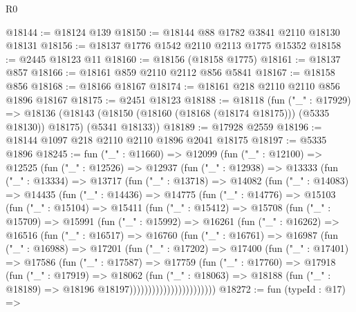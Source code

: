 \begin{lexlean}{R0}
\begin{coremodule}
@18144 := @18124 @139
@18150 := @18144 @88 @1782 @3841 @2110 @18130 @18131
@18156 := @18137 @1776 @1542 @2110 @2113 @1775 @15352
@18158 := @2445 @18123 @11
@18160 := @18156 (@18158 @1775)
@18161 := @18137 @857
@18166 := @18161 @859 @2110 @2112 @856 @5841
@18167 := @18158 @856
@18168 := @18166 @18167
@18174 := @18161 @218 @2110 @2110 @856 @1896 @18167
@18175 := @2451 @18123
@18188 := @18118
    (fun ("_" : @17929) =>
    @18136 (@18143 (@18150 (@18160 (@18168 (@18174 @18175))) (@5335 @18130)) @18175) (@5341 @18133))
@18189 := @17928 @2559
@18196 := @18144 @1097 @218 @2110 @2110 @1896 @2041 @18175
@18197 := @5335 @1896
@18245 := fun ("_" : @11660) =>
  @12099
    (fun ("_" : @12100) =>
    @12525
      (fun ("_" : @12526) =>
      @12937
        (fun ("_" : @12938) =>
        @13333
          (fun ("_" : @13334) =>
          @13717
            (fun ("_" : @13718) =>
            @14082
              (fun ("_" : @14083) =>
              @14435
                (fun ("_" : @14436) =>
                @14775
                  (fun ("_" : @14776) =>
                  @15103
                    (fun ("_" : @15104) =>
                    @15411
                      (fun ("_" : @15412) =>
                      @15708
                        (fun ("_" : @15709) =>
                        @15991
                          (fun ("_" : @15992) =>
                          @16261
                            (fun ("_" : @16262) =>
                            @16516
                              (fun ("_" : @16517) =>
                              @16760
                                (fun ("_" : @16761) =>
                                @16987
                                  (fun ("_" : @16988) =>
                                  @17201
                                    (fun ("_" : @17202) =>
                                    @17400
                                      (fun ("_" : @17401) =>
                                      @17586
                                        (fun ("_" : @17587) =>
                                        @17759
                                          (fun ("_" : @17760) =>
                                          @17918
                                            (fun ("_" : @17919) =>
                                            @18062
                                              (fun ("_" : @18063) =>
                                              @18188
                                                (fun ("_" : @18189) =>
                                                @18196 @18197)))))))))))))))))))))))
@18272 := fun (typeId : @17) =>

\end{coremodule}
\end{lexlean}
